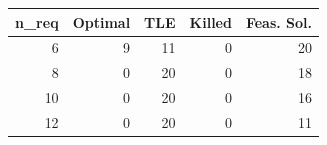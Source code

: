 
\begin{tabular}{rrrrr}
\toprule
n\_req & Optimal & TLE & Killed & Feas. Sol.\\
\midrule
6 & 9 & 11 & 0 & 20\\
8 & 0 & 20 & 0 & 18\\
10 & 0 & 20 & 0 & 16\\
12 & 0 & 20 & 0 & 11\\
\bottomrule
\end{tabular}
